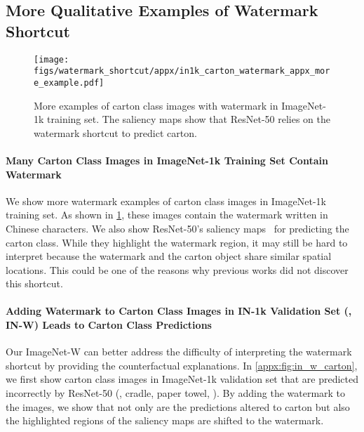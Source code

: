 \documentclass[10pt,twocolumn,letterpaper]{article}
\begin{document}
\clearpage

\subsection{More Qualitative Examples of Watermark Shortcut}
\label{appx:sec:watermark_qualitative_examples}

\begin{figure}[h]
    \centering
    \texttt{[image: figs/watermark\_shortcut/appx/in1k\_carton\_watermark\_appx\_more\_example.pdf]}
    \caption{More examples of carton class images with watermark in ImageNet-1k training set. The saliency maps show that ResNet-50 relies on the watermark shortcut to predict carton.}
    \label{appx:fig:in1k_carton}
\end{figure}

\paragraph{Many Carton Class Images in ImageNet-1k Training Set Contain Watermark} We show more watermark examples of carton class images in ImageNet-1k training set. As shown in \cref{appx:fig:in1k_carton}, these images contain the watermark written in Chinese characters. We also show ResNet-50's saliency maps~\cite{selvaraju2017IEEEInt.Conf.Comput.Vis.ICCVGradCAM} for predicting the carton class. While they highlight the watermark region, it may still be hard to interpret because the watermark and the carton object share similar spatial locations. This could be one of the reasons why previous works did not discover this shortcut.


\paragraph{Adding Watermark to Carton Class Images in IN-1k Validation Set (\ie, IN-W) Leads to Carton Class Predictions} Our ImageNet-W can better address the difficulty of interpreting the watermark shortcut by providing the counterfactual explanations. In \cref{appx:fig:in_w_carton}, we first show carton class images in ImageNet-1k validation set that are predicted incorrectly by ResNet-50 (\eg, cradle, paper towel, \etc). By adding the watermark to the images, we show that not only are the predictions altered to carton but also the highlighted regions of the saliency maps are shifted to the watermark.
\end{document}
